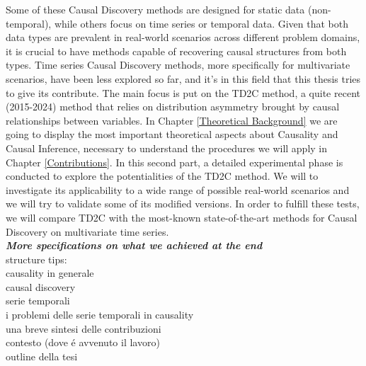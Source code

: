 Some of these Causal Discovery methods are designed for static data (non-temporal), while others focus on time series or temporal data. Given that both data types are prevalent in real-world scenarios across different problem domains, it is crucial to have methods capable of recovering causal structures from both types. Time series Causal Discovery methods, more specifically for multivariate scenarios, have been less explored so far, and it's in this field that this thesis tries to give its contribute. The main focus is put on the TD2C method, a quite recent (2015-2024) method that relies on distribution asymmetry brought by causal relationships between variables. In Chapter \ref{Theoretical Background} we are going to display the most important theoretical aspects about Causality and Causal Inference, necessary to understand the procedures we will apply in Chapter \ref{Contributions}. In this second part, a detailed experimental phase is conducted to explore the potentialities of the TD2C method. We will to investigate its applicability to a wide range of possible real-world scenarios and we will try to validate some of its modified versions. In order to fulfill these tests, we will compare TD2C with the most-known state-of-the-art methods for Causal Discovery on multivariate time series.\\

\textit{\textbf{More specifications on what we achieved at the end}}\\

structure tips:\\
causality in generale \\
causal discovery \\
serie temporali\\
i problemi delle serie temporali in causality \\
una breve sintesi delle contribuzioni\\
contesto (dove é avvenuto il lavoro) \\
outline della tesi
